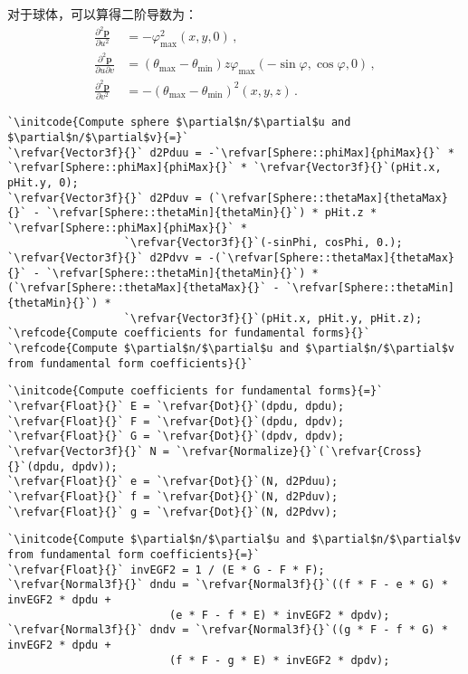 对于球体，可以算得二阶导数为：
\begin{align*}
    \frac{\partial^2\bm p}{\partial u^2}         & =-\varphi_{\max}^2(x,y,0)\, ,                                                 \\
    \frac{\partial^2\bm p}{\partial u\partial v} & =(\theta_{\max}-\theta_{\min})z\varphi_{\max}(-\sin\varphi,\cos\varphi,0)\, , \\
    \frac{\partial^2\bm p}{\partial v^2}         & =-(\theta_{\max}-\theta_{\min})^2(x,y,z)\, .
\end{align*}
\begin{lstlisting}
`\initcode{Compute sphere $\partial$n/$\partial$u and $\partial$n/$\partial$v}{=}`
`\refvar{Vector3f}{}` d2Pduu = -`\refvar[Sphere::phiMax]{phiMax}{}` * `\refvar[Sphere::phiMax]{phiMax}{}` * `\refvar{Vector3f}{}`(pHit.x, pHit.y, 0);
`\refvar{Vector3f}{}` d2Pduv = (`\refvar[Sphere::thetaMax]{thetaMax}{}` - `\refvar[Sphere::thetaMin]{thetaMin}{}`) * pHit.z * `\refvar[Sphere::phiMax]{phiMax}{}` *
                  `\refvar{Vector3f}{}`(-sinPhi, cosPhi, 0.);
`\refvar{Vector3f}{}` d2Pdvv = -(`\refvar[Sphere::thetaMax]{thetaMax}{}` - `\refvar[Sphere::thetaMin]{thetaMin}{}`) * (`\refvar[Sphere::thetaMax]{thetaMax}{}` - `\refvar[Sphere::thetaMin]{thetaMin}{}`) *
                  `\refvar{Vector3f}{}`(pHit.x, pHit.y, pHit.z);
`\refcode{Compute coefficients for fundamental forms}{}`
`\refcode{Compute $\partial$n/$\partial$u and $\partial$n/$\partial$v from fundamental form coefficients}{}`
\end{lstlisting}
\begin{lstlisting}
`\initcode{Compute coefficients for fundamental forms}{=}`
`\refvar{Float}{}` E = `\refvar{Dot}{}`(dpdu, dpdu);
`\refvar{Float}{}` F = `\refvar{Dot}{}`(dpdu, dpdv);
`\refvar{Float}{}` G = `\refvar{Dot}{}`(dpdv, dpdv);
`\refvar{Vector3f}{}` N = `\refvar{Normalize}{}`(`\refvar{Cross}{}`(dpdu, dpdv));
`\refvar{Float}{}` e = `\refvar{Dot}{}`(N, d2Pduu);
`\refvar{Float}{}` f = `\refvar{Dot}{}`(N, d2Pduv);
`\refvar{Float}{}` g = `\refvar{Dot}{}`(N, d2Pdvv);
\end{lstlisting}
\begin{lstlisting}
`\initcode{Compute $\partial$n/$\partial$u and $\partial$n/$\partial$v from fundamental form coefficients}{=}`
`\refvar{Float}{}` invEGF2 = 1 / (E * G - F * F);
`\refvar{Normal3f}{}` dndu = `\refvar{Normal3f}{}`((f * F - e * G) * invEGF2 * dpdu + 
                         (e * F - f * E) * invEGF2 * dpdv);
`\refvar{Normal3f}{}` dndv = `\refvar{Normal3f}{}`((g * F - f * G) * invEGF2 * dpdu + 
                         (f * F - g * E) * invEGF2 * dpdv);
\end{lstlisting}

